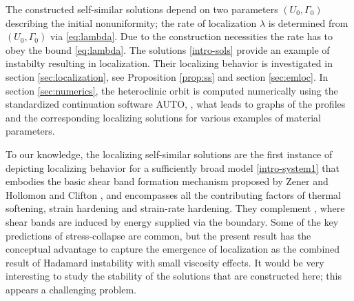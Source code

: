 \documentclass[11pt]{article}
\theoremstyle{remark}
\begin{document}

The constructed self-similar solutions depend on two parameters $(U_0, \Gamma_0)$ describing the initial nonuniformity; the rate of localization $\lambda$ is
determined from $(U_0, \Gamma_0)$ via \eqref{eq:lambda}. Due to the construction necessities the rate has to obey the bound \eqref{eq:lambda}.
The solutions \eqref{intro-sols} provide an example of instabilty resulting in localization. Their localizing behavior is investigated in section \ref{sec:localization}, see
Proposition \ref{prop:ss} and section \ref{sec:emloc}.
In section \ref{sec:numerics}, the heteroclinic orbit is computed numerically using the standardized continuation software AUTO, \cite{Doedel_1981,DK_1986,DCFKSW_1999},
what leads to graphs of the profiles and the corresponding localizing solutions for various examples of material parameters.


To our knowledge, the localizing self-similar solutions are the first instance of depicting localizing behavior for a sufficiently broad model \eqref{intro-system1}
that embodies the basic  shear band formation mechanism proposed by Zener and Hollomon \cite{ZH} and Clifton \cite{clifton_rev_1990}, and encompasses
all the contributing factors  of thermal softening, strain hardening and strain-rate hardening.
They complement \cite{Tz_1987}, where shear bands are induced by energy supplied via the boundary.
Some of the key predictions of stress-collapse are common, but the present result has the conceptual
advantage to capture the emergence of localization as the combined result
of Hadamard instability with small viscosity effects.
It would be very interesting to study the stability of the solutions that are constructed here; this
appears a challenging problem.
\end{document}
